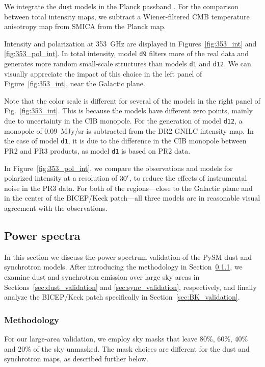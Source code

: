 \documentclass[twocolumn]{aastex631}
\begin{document}
We integrate the dust models in the Planck passband \citep{planck2013-p03d}. For the comparison between total intensity maps, we subtract a Wiener-filtered CMB temperature anisotropy map from SMICA from the Planck map.

Intensity and polarization at 353~GHz are displayed in Figures~\ref{fig:353_int} and \ref{fig:353_pol_int}. 
In total intensity, model {\tt d9} filters more of the real data and generates more random small-scale structures than models {\tt d1} and {\tt d12}. We can visually appreciate the impact of this choice in the left panel of Figure~\ref{fig:353_int}, near the Galactic plane. 

Note that the color scale is different for several of the models in the right panel of Fig.~\ref{fig:353_int}. This is because the models have different zero points, mainly due to uncertainty in the CIB monopole. For the generation of model {\tt d12}, a monopole of 0.09~MJy/sr is subtracted from the DR2 GNILC intensity map. In the case of model {\tt d1}, it is due to the difference in the CIB monopole between PR2 and PR3 products, as model {\tt d1} is based on PR2 data.

In Figure~\ref{fig:353_pol_int}, we compare the observations and models for polarized intensity at a resolution of $30\mbox{$^\prime$}$, to reduce the effects of instrumental noise in the PR3 data. For both of the regions---close to the Galactic plane and in the center of the BICEP/Keck patch---all three models are in reasonable visual agreement with the observations. 

\subsection{Power spectra}
\label{sec:PS-validation}
In this section we discuss the power spectrum validation of the PySM dust and synchrotron models. After introducing the methodology in Section~\ref{subsubsec:methods}, we examine dust and synchrotron emission over large sky areas in Sections~\ref{sec:dust_validation} and \ref{sec:sync_validation}, respectively, and finally analyze the BICEP/Keck patch specifically in Section~\ref{sec:BK_validation}.

\subsubsection{Methodology} \label{subsubsec:methods}
For our large-area validation, we employ sky masks that leave 80\%, 60\%, 40\% and 20\% of the sky unmasked. The mask choices are different for the dust and synchrotron maps, as described further below. 
\end{document}
